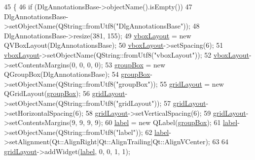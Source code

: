 \begin{DoxyCode}
45     \{
46         \textcolor{keywordflow}{if} (DlgAnnotationsBase->objectName().isEmpty())
47             DlgAnnotationsBase->setObjectName(QString::fromUtf8(\textcolor{stringliteral}{"DlgAnnotationsBase"}));
48         DlgAnnotationsBase->resize(381, 155);
49         \hyperlink{classUi__DlgAnnotationsBase_a3cca923483f98ed4e4002f2449f2d493}{vboxLayout} = \textcolor{keyword}{new} QVBoxLayout(DlgAnnotationsBase);
50         \hyperlink{classUi__DlgAnnotationsBase_a3cca923483f98ed4e4002f2449f2d493}{vboxLayout}->setSpacing(6);
51         \hyperlink{classUi__DlgAnnotationsBase_a3cca923483f98ed4e4002f2449f2d493}{vboxLayout}->setObjectName(QString::fromUtf8(\textcolor{stringliteral}{"vboxLayout"}));
52         \hyperlink{classUi__DlgAnnotationsBase_a3cca923483f98ed4e4002f2449f2d493}{vboxLayout}->setContentsMargins(0, 0, 0, 0);
53         \hyperlink{classUi__DlgAnnotationsBase_a620f381886ee725e9471cbeb91976de4}{groupBox} = \textcolor{keyword}{new} QGroupBox(DlgAnnotationsBase);
54         \hyperlink{classUi__DlgAnnotationsBase_a620f381886ee725e9471cbeb91976de4}{groupBox}->setObjectName(QString::fromUtf8(\textcolor{stringliteral}{"groupBox"}));
55         \hyperlink{classUi__DlgAnnotationsBase_afb984e4e864caf321acbb31c3ff41cf1}{gridLayout} = \textcolor{keyword}{new} QGridLayout(\hyperlink{classUi__DlgAnnotationsBase_a620f381886ee725e9471cbeb91976de4}{groupBox});
56         \hyperlink{classUi__DlgAnnotationsBase_afb984e4e864caf321acbb31c3ff41cf1}{gridLayout}->setObjectName(QString::fromUtf8(\textcolor{stringliteral}{"gridLayout"}));
57         \hyperlink{classUi__DlgAnnotationsBase_afb984e4e864caf321acbb31c3ff41cf1}{gridLayout}->setHorizontalSpacing(6);
58         \hyperlink{classUi__DlgAnnotationsBase_afb984e4e864caf321acbb31c3ff41cf1}{gridLayout}->setVerticalSpacing(6);
59         \hyperlink{classUi__DlgAnnotationsBase_afb984e4e864caf321acbb31c3ff41cf1}{gridLayout}->setContentsMargins(9, 9, 9, 9);
60         \hyperlink{classUi__DlgAnnotationsBase_ae41f677019efd58f0974f5e829324cd2}{label} = \textcolor{keyword}{new} QLabel(\hyperlink{classUi__DlgAnnotationsBase_a620f381886ee725e9471cbeb91976de4}{groupBox});
61         \hyperlink{classUi__DlgAnnotationsBase_ae41f677019efd58f0974f5e829324cd2}{label}->setObjectName(QString::fromUtf8(\textcolor{stringliteral}{"label"}));
62         \hyperlink{classUi__DlgAnnotationsBase_ae41f677019efd58f0974f5e829324cd2}{label}->setAlignment(Qt::AlignRight|Qt::AlignTrailing|Qt::AlignVCenter);
63 
64         \hyperlink{classUi__DlgAnnotationsBase_afb984e4e864caf321acbb31c3ff41cf1}{gridLayout}->addWidget(\hyperlink{classUi__DlgAnnotationsBase_ae41f677019efd58f0974f5e829324cd2}{label}, 0, 0, 1, 1);

\end{DoxyCode}
